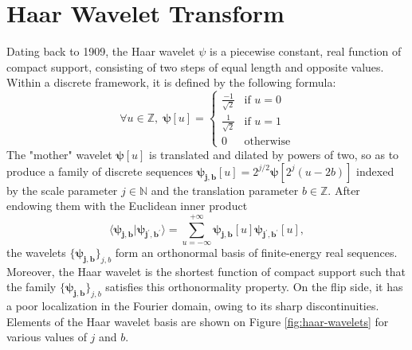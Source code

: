 \documentclass{article}
\begin{document}
\section{Haar Wavelet Transform}\label{sec:haar}
Dating back to 1909, the Haar wavelet $\psi$ is a piecewise constant, real function of compact
support, consisting of two steps of equal length and opposite values. Within a discrete framework,
it is defined by the following formula:
\begin{equation}
\forall u \in \mathbb{Z}, \;
\boldsymbol{\psi}[u] = \left\{ \begin{array}{cl}
\frac{-1}{\sqrt{2}} & \mbox{if }u = 0\\
\frac{1}{\sqrt{2}} & \mbox{if }u = 1\\
0 & \mbox{otherwise}
\end{array}\right.
\end{equation}
The "mother" wavelet $\boldsymbol{\psi}[u]$ is translated and dilated by powers of two, so as to
produce a family of discrete sequences
$\boldsymbol{\psi_{j,b}}[u] = 2^{j/2} \boldsymbol{\psi}[2^j (u - 2b)]$
indexed by the scale parameter $j \in \mathbb{N}$ and the translation parameter $b \in \mathbb{Z}$.
After endowing them with the Euclidean inner product
\begin{equation}
\langle \boldsymbol{\psi_{j,b}} \vert \boldsymbol{\psi_{j^\prime,b^\prime}} \rangle
 =
 \sum_{u = -\infty}^{+\infty}
 \boldsymbol{\psi_{j, b}}[u]
  \boldsymbol{\psi_{j^\prime,b^\prime}}[u],
\end{equation}
the wavelets $\{\boldsymbol{\psi_{j,b}}\}_{j,b}$ form an orthonormal basis of finite-energy
real sequences.
Moreover, the Haar wavelet is the shortest function of compact support such that the family
$\{\boldsymbol{\psi_{j,b}}\}_{j,b}$ satisfies this orthonormality property.
On the flip side, it has a poor localization in the Fourier domain, owing to its sharp discontinuities.
Elements of the Haar wavelet basis are shown on Figure \ref{fig:haar-wavelets}
for various values of $j$ and $b$.
\end{document}
